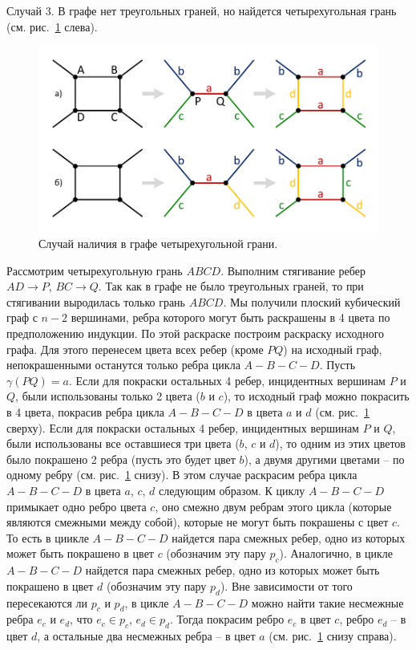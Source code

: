 Случай 3. В графе нет треугольных граней, но найдется четырехугольная грань (см. рис.~\ref{fig:text_3_graph_prim_coloring4_face4} слева).

\begin{figure}[ht]
\centering
\includegraphics[width=1.0\textwidth]{./pics/text_3_graph_prim/coloring4_face4.pdf}
\singlespacing
{}\caption{Случай наличия в графе четырехугольной грани.}
\label{fig:text_3_graph_prim_coloring4_face4}
\end{figure}

Рассмотрим четырехугольную грань $ABCD$.
Выполним стягивание ребер $AD \rightarrow P$, $BC \rightarrow Q$.
Так как в графе не было треугольных граней, то при стягивании выродилась только грань $ABCD$.
Мы получили плоский кубический граф с $n - 2$ вершинами, ребра которого могут быть раскрашены в 4 цвета по предположению индукции.
По этой раскраске построим раскраску исходного графа.
Для этого перенесем цвета всех ребер (кроме $PQ$) на исходный граф, непокрашенными останутся только ребра цикла $A-B-C-D$.
Пусть $\gamma(PQ) = a$.
Если для покраски остальных 4 ребер, инцидентных вершинам $P$ и $Q$, были использованы только 2 цвета ($b$ и $c$), то исходный граф можно покрасить в 4 цвета, покрасив ребра цикла $A-B-C-D$ в цвета $a$ и $d$ (см. рис.~\ref{fig:text_3_graph_prim_coloring4_face4} сверху).
Если для покраски остальных 4 ребер, инцидентных вершинам $P$ и $Q$, были использованы все оставшиеся три цвета ($b$, $c$ и $d$), то одним из этих цветов было покрашено 2 ребра (пусть это будет цвет $b$), а двумя другими цветами -- по одному ребру (см. рис.~\ref{fig:text_3_graph_prim_coloring4_face4} снизу).
В этом случае раскрасим ребра цикла $A-B-C-D$ в цвета $a$, $c$, $d$ следующим образом.
К циклу $A-B-C-D$ примыкает одно ребро цвета $c$, оно смежно двум ребрам этого цикла (которые являются смежными между собой), которые не могут быть покрашены с цвет $c$.
То есть в циикле $A-B-C-D$ найдется пара смежных ребер, одно из которых может быть покрашено в цвет $c$ (обозначим эту пару $p_c$).
Аналогично, в цикле $A-B-C-D$ найдется пара смежных ребер, одно из которых может быть покрашено в цвет $d$ (обозначим эту пару $p_d$).
Вне зависимости от того пересекаются ли $p_c$ и $p_d$, в цикле $A-B-C-D$ можно найти такие несмежные ребра $e_c$ и $e_d$, что $e_c \in p_c$, $e_d \in p_d$.
Тогда покрасим ребро $e_c$ в цвет $c$, ребро $e_d$ -- в цвет $d$, а остальные два несмежных ребра -- в цвет $a$ (см. рис.~\ref{fig:text_3_graph_prim_coloring4_face4} снизу справа).


